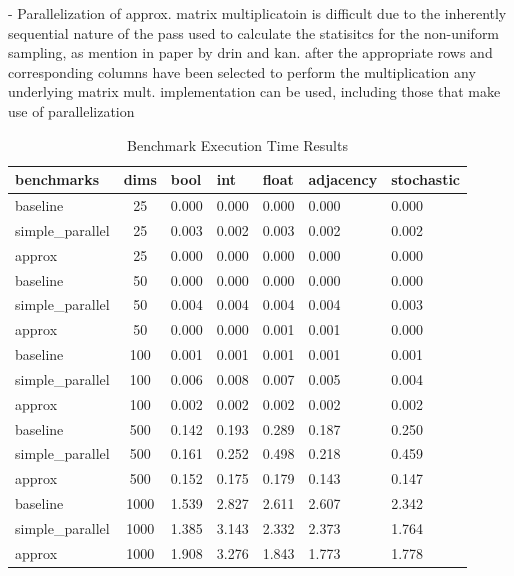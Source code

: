 \documentclass[oneside]{article}
\begin{document}
- Parallelization of approx. matrix multiplicatoin is difficult due to the inherently sequential nature of the pass used to calculate the statisitcs for the non-uniform sampling, as mention in paper by drin and kan. after the appropriate rows and corresponding columns have been selected to perform the multiplication any underlying
matrix mult. implementation can be used, including those that make use of parallelization



\begin{table}[ht!]
\centering
\caption{Benchmark Execution Time Results}
{\renewcommand{\arraystretch}{1.15}}
\begin{tabular}{|l|c|l|l|l|l|l|} \hline
benchmarks&        dims&       bool&        int&       float&    adjacency&    stochastic\\ \hline
baseline&             25&      0.000&       0.000&     0.000&    0.000&     0.000\\ \hline
simple\_parallel&     25&      0.003&       0.002&     0.003&    0.002&     0.002\\ \hline
approx&               25&      0.000&       0.000&     0.000&    0.000&     0.000\\ \hline
baseline&             50&      0.000&       0.000&     0.000&    0.000&     0.000\\ \hline
simple\_parallel&     50&      0.004&       0.004&     0.004&    0.004&     0.003\\ \hline
approx&               50&      0.000&       0.000&     0.001&    0.001&     0.000\\ \hline
baseline&            100&      0.001&       0.001&     0.001&    0.001&     0.001\\ \hline
simple\_parallel&    100&      0.006&       0.008&     0.007&    0.005&     0.004\\ \hline
approx&              100&      0.002&       0.002&     0.002&    0.002&     0.002\\ \hline
baseline&            500&      0.142&       0.193&     0.289&    0.187&     0.250\\ \hline
simple\_parallel&    500&      0.161&       0.252&     0.498&    0.218&     0.459\\ \hline
approx&              500&      0.152&       0.175&     0.179&    0.143&     0.147\\ \hline
baseline&           1000&      1.539&       2.827&     2.611&    2.607&     2.342\\ \hline
simple\_parallel&   1000&      1.385&       3.143&     2.332&    2.373&     1.764\\ \hline
approx&             1000&      1.908&       3.276&     1.843&    1.773&     1.778\\ \hline
\end{tabular}
\label{table:benchmark}
\end{table}
\end{document}
